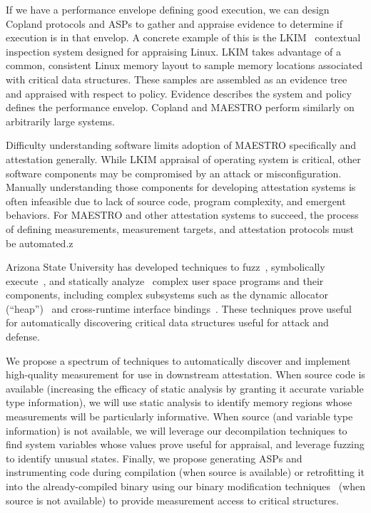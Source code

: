 \documentclass[runningheads]{llncs}
\begin{document}
If we have a performance envelope defining good execution, we can design Copland
protocols and ASPs to gather and appraise evidence to determine if execution is
in that envelop.  A concrete example of this is the
LKIM~\citep{Loscocco:07:Linux-kernel-in} contextual inspection system designed
for appraising Linux.  LKIM takes advantage of a common, consistent Linux memory layout to sample memory locations associated with
critical data structures.  These samples are assembled as an evidence tree
and appraised with respect to policy.  Evidence describes the system and policy
defines the performance envelop.  Copland and MAESTRO perform similarly on
arbitrarily large systems.

Difficulty understanding software limits adoption of MAESTRO specifically and
attestation generally.  While LKIM appraisal of operating system is critical,
other software components may be compromised by an attack or
misconfiguration.  Manually understanding those components for developing
attestation systems is often infeasible due to lack of source code, program
complexity, and emergent behaviors.  For MAESTRO and other attestation systems
to succeed, the process of defining measurements, measurement targets, and
attestation protocols must be automated.z

Arizona State University has developed
techniques to fuzz~\citep{trickel2022toss,salls2020exploring,peng2018t}, symbolically execute~\citep{stephens2016driller,shoshitaishvili2016sok}, and statically analyze~\citep{das2022hybrid,vadayath2022arbiter} complex user space programs and their components, including complex subsystems such as the dynamic allocator (``heap'')~\citep{eckert2018heaphopper} and cross-runtime interface bindings~\citep{dinh2021favocado}.
These techniques prove useful for automatically discovering critical data structures useful for attack and defense.

We propose a spectrum of techniques to automatically discover and
implement high-quality measurement for use in downstream attestation.
When source code is available (increasing the efficacy of static analysis by granting it accurate variable type information), we will use static analysis to identify memory regions whose measurements will be particularly informative.
When source (and variable type information) is not available, we will leverage our decompilation techniques to find system variables whose values prove useful for appraisal, and leverage fuzzing to identify unusual states.
Finally, we propose generating ASPs and instrumenting code during compilation (when source is available) or retrofitting it into the already-compiled binary using our binary modification techniques~\citep{wang2017ramblr} (when source is not available) to provide measurement access to critical structures.
\end{document}
